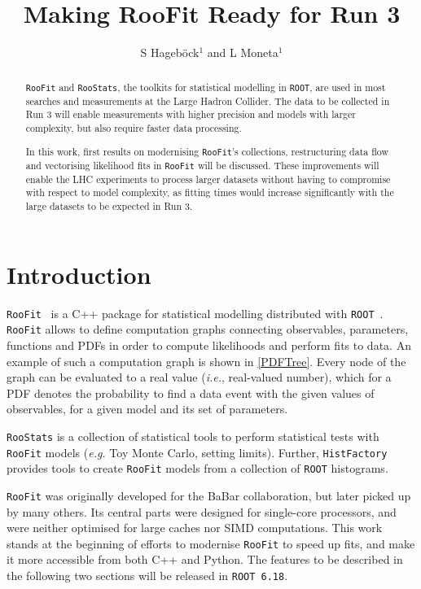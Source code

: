 \documentclass[a4paper]{jpconf}
\newcommand{\RooFit}{\texttt{RooFit}\xspace}
\newcommand{\RooStats}{\texttt{RooStats}\xspace}
\newcommand{\ROOT}{\texttt{ROOT}\xspace}
\begin{document}
\title{Making RooFit Ready for Run 3}
\author{S Hageb\"ock$^1$ and L Moneta$^1$}
\address{$^1$ CERN, 1211 Geneva 23, Switzerland}

\begin{abstract}
\RooFit and \RooStats, the toolkits for statistical modelling in \ROOT, are used in most searches and measurements at the Large Hadron Collider. The data to be collected in Run 3 will enable measurements with higher precision and models with larger complexity, but also require faster data processing.

In this work, first results on modernising \RooFit's collections, restructuring data flow and vectorising likelihood fits in \RooFit will be discussed. These improvements will enable the LHC experiments to process larger datasets without having to compromise with respect to model complexity, as fitting times would increase significantly with the large datasets to be expected in Run 3.
\end{abstract}

\section{Introduction}
\texttt{RooFit}~\cite{RooFit} is a C++ package for statistical modelling distributed with \texttt{ROOT}~\cite{ROOT}.
\RooFit allows to define computation graphs connecting observables, parameters, functions and PDFs in order to compute likelihoods and perform fits to data. An example of such a computation graph is shown in \cref{PDFTree}. Every node of the graph can be
evaluated to a real value (\textit{i.e.}, real-valued number), which for a PDF denotes the probability to find a data event with the given
values of observables, for a given model and its set of parameters.

\texttt{RooStats} is a collection of statistical tools to perform statistical tests with \texttt{RooFit}
models (\textit{e.g.} Toy Monte Carlo, setting limits). Further, \texttt{HistFactory} provides tools to create \RooFit models from a collection of \ROOT histograms.

\RooFit was originally developed for the BaBar collaboration, but later picked up by many others. Its central parts were designed for
single-core processors, and were neither optimised for large caches nor SIMD computations. This work stands at the beginning of efforts to
modernise \RooFit to speed up fits, and make it more accessible from both C++ and Python. The features to be described in the following two sections will be released in \texttt{\ROOT 6.18}.
\end{document}
